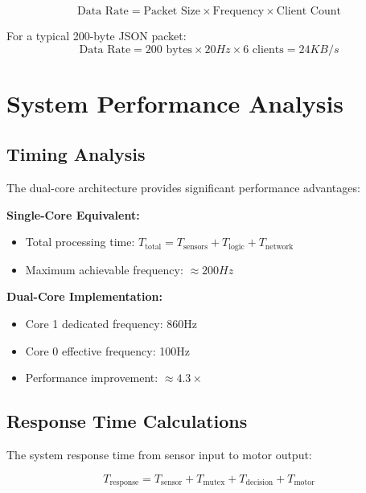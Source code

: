 \documentclass[12pt,a4paper]{article}
\begin{document}
\begin{equation}
\text{Data Rate} = \text{Packet Size} \times \text{Frequency} \times \text{Client Count}
\end{equation}

For a typical 200-byte JSON packet:
\begin{equation}
\text{Data Rate} = 200 \text{ bytes} \times 20Hz \times 6 \text{ clients} = 24KB/s
\end{equation}

\section{System Performance Analysis}

\subsection{Timing Analysis}

The dual-core architecture provides significant performance advantages:

\begin{tcolorbox}[colback=yellow!5!white,colframe=yellow!75!black,title=Performance Metrics]
\textbf{Single-Core Equivalent:}
\begin{itemize}
    \item Total processing time: $T_{\text{total}} = T_{\text{sensors}} + T_{\text{logic}} + T_{\text{network}}$
    \item Maximum achievable frequency: $\approx 200Hz$
\end{itemize}

\textbf{Dual-Core Implementation:}
\begin{itemize}
    \item Core 1 dedicated frequency: 860Hz
    \item Core 0 effective frequency: 100Hz
    \item Performance improvement: $\approx 4.3\times$
\end{itemize}
\end{tcolorbox}

\subsection{Response Time Calculations}

The system response time from sensor input to motor output:

\begin{equation}
T_{\text{response}} = T_{\text{sensor}} + T_{\text{mutex}} + T_{\text{decision}} + T_{\text{motor}}
\end{equation}
\end{document}
